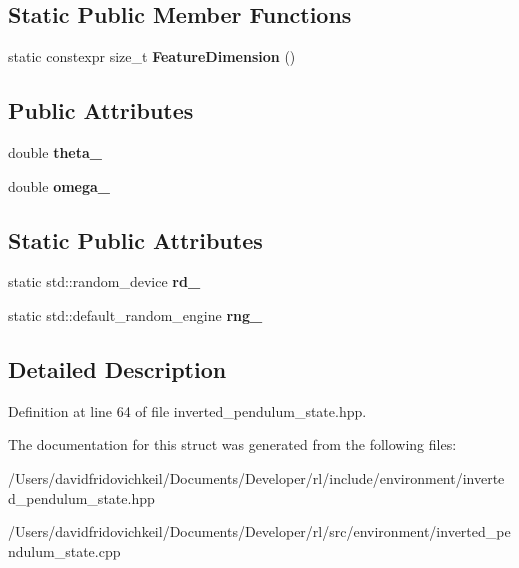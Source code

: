 \subsection*{Static Public Member Functions}
\begin{DoxyCompactItemize}
\item 
\hypertarget{structrl_1_1_inverted_pendulum_state_a683d833dbaaf81b26e89923b3348c152}{}\label{structrl_1_1_inverted_pendulum_state_a683d833dbaaf81b26e89923b3348c152} 
static constexpr size\+\_\+t {\bfseries Feature\+Dimension} ()
\end{DoxyCompactItemize}
\subsection*{Public Attributes}
\begin{DoxyCompactItemize}
\item 
\hypertarget{structrl_1_1_inverted_pendulum_state_a9fd734b2f30861433d5097f308a61607}{}\label{structrl_1_1_inverted_pendulum_state_a9fd734b2f30861433d5097f308a61607} 
double {\bfseries theta\+\_\+}
\item 
\hypertarget{structrl_1_1_inverted_pendulum_state_a1e787a04976dca05700d3d50d735cb36}{}\label{structrl_1_1_inverted_pendulum_state_a1e787a04976dca05700d3d50d735cb36} 
double {\bfseries omega\+\_\+}
\end{DoxyCompactItemize}
\subsection*{Static Public Attributes}
\begin{DoxyCompactItemize}
\item 
\hypertarget{structrl_1_1_inverted_pendulum_state_a189ffbef88ab999852cbf1a9e4be6a39}{}\label{structrl_1_1_inverted_pendulum_state_a189ffbef88ab999852cbf1a9e4be6a39} 
static std\+::random\+\_\+device {\bfseries rd\+\_\+}
\item 
\hypertarget{structrl_1_1_inverted_pendulum_state_accb3de9063ce4109dabf20f2b40c7391}{}\label{structrl_1_1_inverted_pendulum_state_accb3de9063ce4109dabf20f2b40c7391} 
static std\+::default\+\_\+random\+\_\+engine {\bfseries rng\+\_\+}
\end{DoxyCompactItemize}


\subsection{Detailed Description}


Definition at line 64 of file inverted\+\_\+pendulum\+\_\+state.\+hpp.



The documentation for this struct was generated from the following files\+:\begin{DoxyCompactItemize}
\item 
/\+Users/davidfridovichkeil/\+Documents/\+Developer/rl/include/environment/inverted\+\_\+pendulum\+\_\+state.\+hpp\item 
/\+Users/davidfridovichkeil/\+Documents/\+Developer/rl/src/environment/inverted\+\_\+pendulum\+\_\+state.\+cpp\end{DoxyCompactItemize}

